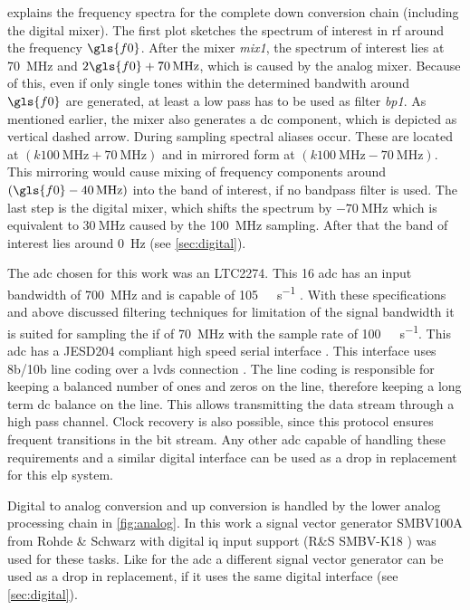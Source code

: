 \documentclass[12pt,a4paper,parskip=full,abstract=true,BCOR=12mm]{scrreprt}
\def\device#1{\mbox{\textit{#1}}}
\begin{document}
 explains the frequency spectra for the complete down
conversion chain (including the digital mixer). The first plot sketches the
spectrum of interest in \gls{rf} around the frequency $\gls{f0}$. After the mixer \device{mix1}, the
spectrum of interest lies at \SI{70}{\mega\hertz} and $2\gls{f0} + \SI{70}{\mega\hertz}$,
which is caused by the analog mixer. Because of this, even if only single tones
within the determined bandwith around $\gls{f0}$ are generated, at least a low pass
has to be used as filter \device{bp1}. As mentioned earlier, the mixer also generates a \gls{dc} component, which is depicted as vertical dashed arrow. During sampling spectral aliases occur. These
are located at $(k \SI{100}{\mega\hertz} + \SI{70}{\mega\hertz})$ and in mirrored form at
$(k \SI{100}{\mega\hertz} - \SI{70}{\mega\hertz})$. This mirroring would cause mixing
of frequency components around $(\gls{f0} - \SI{40}{\mega\hertz})$ into the band of interest,
if no bandpass filter is used. The last step is the digital mixer, which shifts
the spectrum by $\SI{-70}{\mega\hertz}$ which is equivalent to $\SI{+30}{\mega\hertz}$ caused by the \SI{100}{\mega\hertz} sampling. After that the band of interest lies around
\SI{0}{\hertz} (see \cref{sec:digital}).

The \gls{adc} chosen for this work was an LTC2274. This \SI{16}{\bit} \gls{adc}
has an input bandwidth of \SI{700}{\mega\hertz} and is capable of
\SI{105}{\mega\samples\per\second} \cite{ltc2274}. With these specifications and above discussed filtering techniques for limitation of the signal bandwidth it
is suited for sampling the \gls{if} of \SI{70}{\mega\hertz} with the sample rate
of \SI{100}{\mega\samples\per\second}. This \gls{adc} has a
JESD204 compliant high speed serial interface \cite{ltc2274}. This interface uses 8b/10b
line coding over a \gls{lvds} connection \cite{jesd205B.01}. The line coding
is responsible for keeping a balanced number of ones and zeros on the line, therefore keeping a long term
\gls{dc} balance on the line. This allows transmitting the data stream through a high pass
channel. Clock recovery is also possible, since this protocol ensures frequent transitions
in the bit stream. Any other \gls{adc} capable of handling
these requirements and a similar digital interface can be used as a drop in
replacement for this \gls{elp} system.

Digital to analog conversion and up conversion is handled by the lower analog
processing chain in \cref{fig:analog}. In this work a signal vector generator
SMBV100A from Rohde \& Schwarz with digital \gls{iq} input support (R\&S SMBV-K18
\cite{smbv_100a}) was used for these tasks. Like for the \gls{adc} a different
signal vector generator can be used as a drop in replacement, if it uses
the same digital interface (see \cref{sec:digital}).
\end{document}
